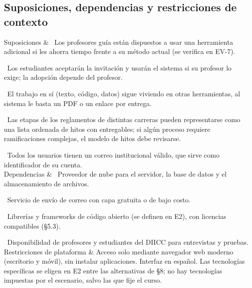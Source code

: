 \documentclass[10pt,a4paper]{article}
\newenvironment{kv}[1][4.6cm]
  {\footnotesize\setlength{\extrarowheight}{3pt}\xltabular{\linewidth}{|E{#1}|L|}\hline}
  {\endxltabular}
\newcommand{\kvrow}[2]{#1 & #2 \\ \hline}
\begin{document}
\subsection{Suposiciones, dependencias y restricciones de contexto}
\begin{kv}
\kvrow{Suposiciones}{%
\textbullet~Los profesores guía están dispuestos a usar una herramienta adicional si les ahorra tiempo frente a su método actual (se verifica en EV-7).\par
\textbullet~Los estudiantes aceptarán la invitación y usarán el sistema si su profesor lo exige; la adopción depende del profesor.\par
\textbullet~El trabajo en sí (texto, código, datos) sigue viviendo en otras herramientas, al sistema le basta un PDF o un enlace por entrega.\par
\textbullet~Las etapas de los reglamentos de distintas carreras pueden representarse como una lista ordenada de hitos con entregables; si algún proceso requiere ramificaciones complejas, el modelo de hitos debe revisarse.\par
\textbullet~Todos los usuarios tienen un correo institucional válido, que sirve como identificador de su cuenta.}
\kvrow{Dependencias}{%
\textbullet~Proveedor de nube para el servidor, la base de datos y el almacenamiento de archivos.\par
\textbullet~Servicio de envío de correo con capa gratuita o de bajo costo.\par
\textbullet~Librerías y frameworks de código abierto (se definen en E2), con licencias compatibles (§5.3).\par
\textbullet~Disponibilidad de profesores y estudiantes del DIICC para entrevistas y pruebas.}
\kvrow{Restricciones de plataforma}{Acceso solo mediante navegador web moderno (escritorio y móvil), sin instalar aplicaciones. Interfaz en español. Las tecnologías específicas se eligen en E2 entre las alternativas de §8; no hay tecnologías impuestas por el escenario, salvo las que fije el curso.}
\end{kv}
\end{document}
